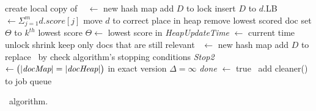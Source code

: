 \begin{algorithm*}[tbh]
\begin{multicols}{2}
\begin{algorithmic}[1]
\Statex		
	\Comment create local copy of \DMap\ %
        			\State \TMap[i] $\leftarrow$ new hash map
            			\State add $D$ to \TMap[i] \label{l:hash-chash}
            		\EndFor
\EndProcedure
{} 
\State lock \DHeap \label{l:lock-heap}
	\State insert $D$ to \DHeap
	  \label{l:for-all-heap-docs}
		\State $d$.LB $\leftarrow \Sigma_{j=1}^{m} d.score[j]$
		\State move $d$ to correct place in heap \label{l:fix-heap}
	\EndFor
		\State remove lowest scored doc %
	\EndIf
		\Statex \Comment set $\Theta$ to $k^{th}$ lowest score
		\State  $\Theta \leftarrow$ lowest score in \DHeap
	\EndIf
	\State \emph{HeapUpdateTime} $\leftarrow$ current time 
\EndIf
\State unlock \DHeap  \label{l:unlock-heap}
\EndProcedure
%
%
\Statex 
\Statex
{} \label{l:clean-start}
\If{$|\DMap | > \Phi $} 
 \Comment shrink \DMap 
 \State \Comment keep only docs that are still relevant
\State \LDMap\ $\leftarrow$ new hash map \label{l:clean-local-copy}
{} 
	\State add   $D$ to \LDMap
\EndIf
\EndFor
\State replace \DMap\ by \LDMap \label{l:clean-replace}
\EndIf
\Statex
\Statex \Comment check algorithm's stopping conditions
\State \emph{Stop2} $\leftarrow \big( |\textit{docMap}| = |\textit{docHeap}| \big)$ \label{l:clean-stop-cond}
\Statex  \Comment in exact version $\Delta=\infty$
\State \emph{done} $\leftarrow$ true
\Else\ add {\sc cleaner()} to job queue
\EndIf
\label{l:clean-end}
\EndProcedure 
\Statex
\end{algorithmic}
\end{multicols}
\caption{\alg\ algorithm.}
\label{alg:sparta}
\end{algorithm*}